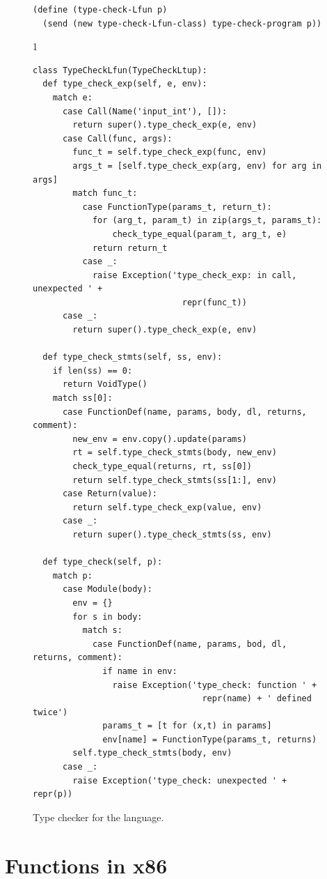 \documentclass[7x10]{TimesAPriori_MIT}%
\def\pythonEd{1}
\providecommand{\BookEdition}{1}
\let\edition\BookEdition
\newcommand{\pythonColor}[0]{}
\numberwithin{theorem}{chapter}
\numberwithin{definition}{chapter}
\numberwithin{equation}{chapter}
\begin{document}
\begin{figure}[tp]
\begin{tcolorbox}[colback=white]
{\begin{lstlisting}[basicstyle=\ttfamily\footnotesize]
(define (type-check-Lfun p)
  (send (new type-check-Lfun-class) type-check-program p))
\end{lstlisting}
\fi}
{\if\edition\pythonEd\pythonColor
\begin{lstlisting}  
class TypeCheckLfun(TypeCheckLtup):
  def type_check_exp(self, e, env):
    match e:
      case Call(Name('input_int'), []):
        return super().type_check_exp(e, env)      
      case Call(func, args):
        func_t = self.type_check_exp(func, env)
        args_t = [self.type_check_exp(arg, env) for arg in args]
        match func_t:
          case FunctionType(params_t, return_t):
            for (arg_t, param_t) in zip(args_t, params_t):
                check_type_equal(param_t, arg_t, e)
            return return_t
          case _:
            raise Exception('type_check_exp: in call, unexpected ' +
                              repr(func_t))
      case _:
        return super().type_check_exp(e, env)

  def type_check_stmts(self, ss, env):
    if len(ss) == 0:
      return VoidType()
    match ss[0]:
      case FunctionDef(name, params, body, dl, returns, comment):
        new_env = env.copy().update(params)
        rt = self.type_check_stmts(body, new_env)
        check_type_equal(returns, rt, ss[0])
        return self.type_check_stmts(ss[1:], env)
      case Return(value):
        return self.type_check_exp(value, env)
      case _:
        return super().type_check_stmts(ss, env)

  def type_check(self, p):
    match p:
      case Module(body):
        env = {}
        for s in body:
          match s:
            case FunctionDef(name, params, bod, dl, returns, comment):
              if name in env:
                raise Exception('type_check: function ' +
                                  repr(name) + ' defined twice')
              params_t = [t for (x,t) in params]
              env[name] = FunctionType(params_t, returns)
        self.type_check_stmts(body, env)
      case _:
        raise Exception('type_check: unexpected ' + repr(p))
\end{lstlisting}
\fi}
  \end{tcolorbox}

  \caption{Type checker for the \LangFun{} language.}
\label{fig:type-check-Lfun}
\end{figure}


\clearpage

\section{Functions in x86}
\label{sec:fun-x86}
\end{document}
